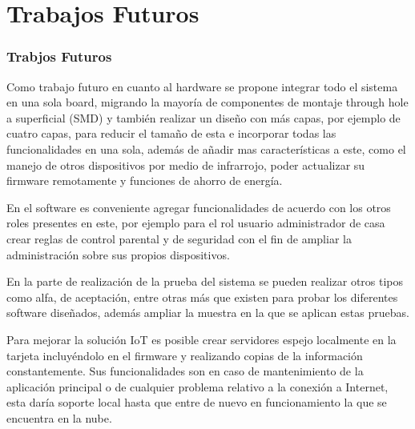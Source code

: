 \section{Trabajos Futuros}

\begin{frame}
\frametitle{Trabjos Futuros}

Como trabajo futuro en cuanto al hardware se propone integrar todo el sistema en una sola board, migrando la mayoría de componentes de montaje through hole a superficial (SMD) y también realizar un diseño con más capas, por ejemplo de cuatro capas, para reducir el tamaño de esta e incorporar todas las funcionalidades en una sola, además de añadir mas características a este, como el manejo de otros dispositivos por medio de infrarrojo, poder actualizar su firmware remotamente y funciones de ahorro de energía.\newline

En el software es conveniente agregar funcionalidades de acuerdo con los otros roles presentes en este, por ejemplo para el rol usuario administrador de casa crear reglas de control parental y de seguridad con el fin de ampliar la administración sobre sus propios dispositivos.\\

\end{frame}

\begin{frame}

En la parte de realización de la prueba del sistema se pueden realizar otros tipos como alfa, de aceptación, entre otras más que existen para probar los diferentes software diseñados, además ampliar la muestra en la que se aplican estas pruebas.\newline

Para mejorar la solución IoT es posible crear servidores espejo localmente en la tarjeta incluyéndolo en el firmware y realizando copias de la información constantemente. Sus funcionalidades son en caso de mantenimiento de la aplicación principal o de cualquier problema relativo a la conexión a Internet, esta daría soporte local hasta que entre de nuevo en funcionamiento la que se encuentra en la nube.\\
\end{frame}